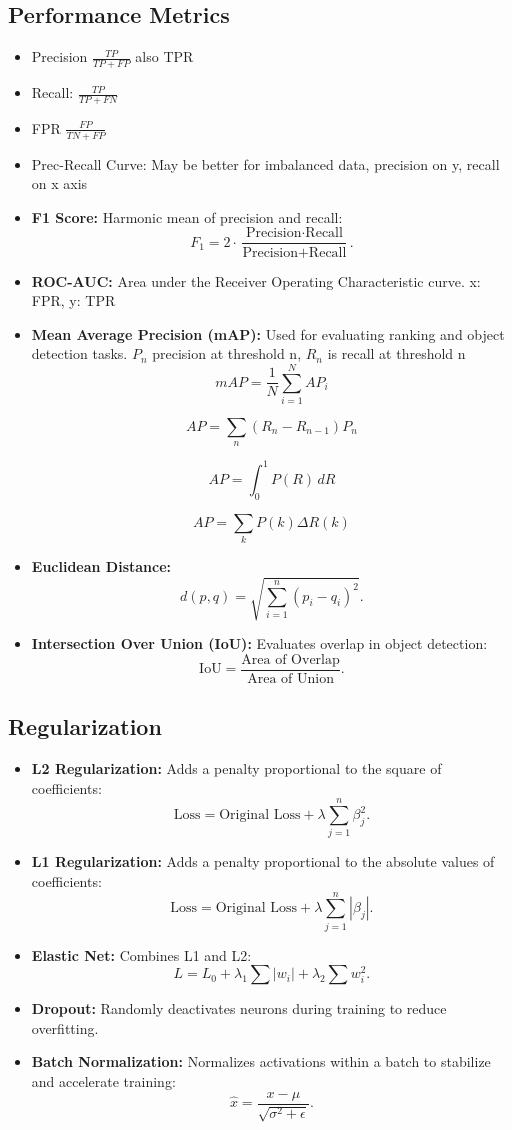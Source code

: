 \documentclass[12pt,a4paper]{article}
\begin{document}
\subsection{Performance Metrics}
\begin{itemize}
\item Precision $\frac{TP}{TP+FP}$ also TPR
\item Recall: $\frac{TP}{TP+FN}$
\item FPR $\frac{FP}{TN+FP}$
\item Prec-Recall Curve: May be better for imbalanced data, precision on y, recall on x axis
    \item \textbf{F1 Score:} Harmonic mean of precision and recall:
    \[ F_1 = 2 \cdot \frac{\text{Precision} \cdot \text{Recall}}{\text{Precision} + \text{Recall}}. \]
    \item \textbf{ROC-AUC:} Area under the Receiver Operating Characteristic curve. x: FPR, y: TPR
    \item \textbf{Mean Average Precision (mAP):} Used for evaluating ranking and object detection tasks. $P_n$ precision at threshold n, $R_n$ is recall at threshold n 
    \[
mAP = \frac{1}{N} \sum_{i=1}^{N} AP_i
\]

\[
AP = \sum_n (R_n - R_{n-1}) P_n
\]

\[
AP = \int_0^1 P(R) \, dR
\]

\[
AP = \sum_{k} P(k) \Delta R(k)
\]
    \item \textbf{Euclidean Distance:} \[ d(p, q) = \sqrt{\sum_{i=1}^n (p_i - q_i)^2}. \]
    \item \textbf{Intersection Over Union (IoU):} Evaluates overlap in object detection:
    \[ \text{IoU} = \frac{\text{Area of Overlap}}{\text{Area of Union}}. \]
\end{itemize}

\subsection{Regularization}
\begin{itemize}
    \item \textbf{L2 Regularization:} Adds a penalty proportional to the square of coefficients:
    \[ \text{Loss} = \text{Original Loss} + \lambda \sum_{j=1}^n \beta_j^2. \]
    \item \textbf{L1 Regularization:} Adds a penalty proportional to the absolute values of coefficients:
    \[ \text{Loss} = \text{Original Loss} + \lambda \sum_{j=1}^n |\beta_j|. \]
    \item \textbf{Elastic Net:} Combines L1 and L2:
    \[ L = L_0 + \lambda_1 \sum |w_i| + \lambda_2 \sum w_i^2. \]
    \item \textbf{Dropout:} Randomly deactivates neurons during training to reduce overfitting.
    \item \textbf{Batch Normalization:} Normalizes activations within a batch to stabilize and accelerate training:
    \[ \hat{x} = \frac{x - \mu}{\sqrt{\sigma^2 + \epsilon}}. \]
\end{itemize}
\end{document}
